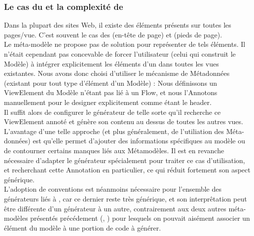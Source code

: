 \subsubsection{Le cas du  et la complexité de \kwcinematic}\label{par:cinematic_header}
Dans la plupart des sites Web, il existe des éléments présents sur toutes les pages/vue. C'est souvent le cas des  (en-tête de page) et  (pieds de page).\\
Le méta-modèle \kwcinematic ne propose pas de solution pour représenter de tels éléments. Il n'était cependant pas concevable de forcer l'utilisateur (celui qui construit le Modèle) à intégrer explicitement les éléments d'un  dans toutes les vues existantes.
Nous avons donc choisi d'utiliser le mécanisme de Métadonnées (existant pour tout type d'élément d'un Modèle) : Nous définissons un ViewElement du Modèle n'étant pas lié à un Flow, et nous l'Annotons manuellement pour le designer explicitement comme étant le header.\\
Il suffit alors de configurer le générateur de telle sorte qu'il recherche ce ViewElement annoté et génère son contenu au dessus de toutes les autres vues. L'avantage d'une telle approche (et plus généralement, de l'utiliation des Méta-données) est qu'elle permet d'ajouter des informations spécifiques au modèle ou de contourner certains manques liés aux Métamodèles. Il est en revanche nécessaire d'adapter le générateur spécialement pour traiter ce cas d'utilisation, et recherchant cette Annotation en particulier, ce qui réduit fortement son aspect générique.\\
L'adoption de conventions est néanmoins nécessaire pour l'ensemble des générateurs liés à \kwcinematic, car ce dernier reste très générique, et son interprêtation peut être différente d'un générateur à un autre, contrairement aux deux autres méta-modèles présentés précédement (\kwentity, \kwsoa) pour lesquels on pouvait aisément associer un élément du modèle à une portion de code à générer.
